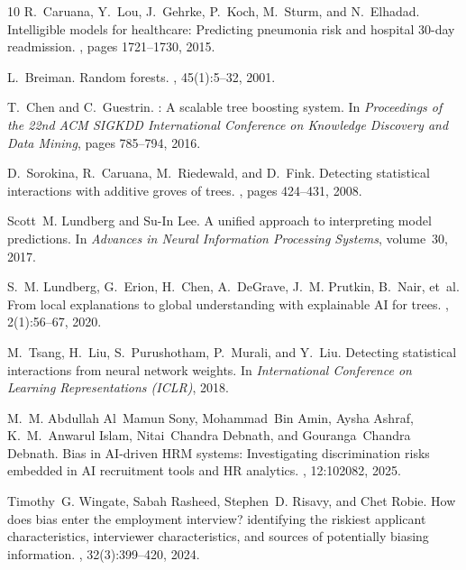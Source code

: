 \documentclass[twocolumn]{article}
\begin{document}
\begin{thebibliography}{10}
R.~Caruana, Y.~Lou, J.~Gehrke, P.~Koch, M.~Sturm, and N.~Elhadad.
\newblock Intelligible models for healthcare: Predicting pneumonia risk and
  hospital 30-day readmission.
, pages 1721--1730, 2015.

L.~Breiman.
\newblock Random forests.
, 45(1):5--32, 2001.

T.~Chen and C.~Guestrin.
: A scalable tree boosting system.
\newblock In {\em Proceedings of the 22nd ACM SIGKDD International Conference
  on Knowledge Discovery and Data Mining}, pages 785--794, 2016.

D.~Sorokina, R.~Caruana, M.~Riedewald, and D.~Fink.
\newblock Detecting statistical interactions with additive groves of trees.
, pages 424--431, 2008.

Scott~M. Lundberg and Su-In Lee.
\newblock A unified approach to interpreting model predictions.
\newblock In {\em Advances in Neural Information Processing Systems},
  volume~30, 2017.

S.~M. Lundberg, G.~Erion, H.~Chen, A.~DeGrave, J.~M. Prutkin, B.~Nair, et~al.
\newblock From local explanations to global understanding with explainable {AI}
  for trees.
, 2(1):56--67, 2020.

M.~Tsang, H.~Liu, S.~Purushotham, P.~Murali, and Y.~Liu.
\newblock Detecting statistical interactions from neural network weights.
\newblock In {\em International Conference on Learning Representations (ICLR)},
  2018.

M.~M. Abdullah Al~Mamun Sony, Mohammad~Bin Amin, Aysha Ashraf, K.~M.~Anwarul
  Islam, Nitai~Chandra Debnath, and Gouranga~Chandra Debnath.
\newblock Bias in {AI}-driven {HRM} systems: Investigating discrimination risks
  embedded in {AI} recruitment tools and {HR} analytics.
, 12:102082, 2025.

Timothy~G. Wingate, Sabah Rasheed, Stephen~D. Risavy, and Chet Robie.
\newblock How does bias enter the employment interview? identifying the
  riskiest applicant characteristics, interviewer characteristics, and sources
  of potentially biasing information.
,
  32(3):399--420, 2024.


\end{thebibliography}
\end{document}
